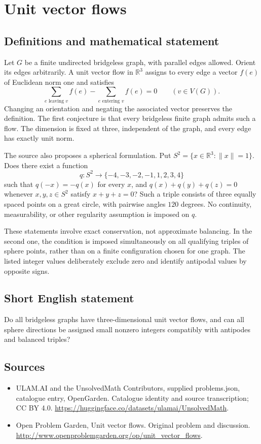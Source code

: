 \documentclass[11pt,a4paper]{article}
\begin{document}
\section*{Unit vector flows}\label{statement}

\subsection{Definitions and mathematical statement}
Let $G$ be a finite undirected bridgeless graph, with parallel edges allowed. Orient its edges arbitrarily. A unit vector flow in $\mathbb R^3$ assigns to every edge a vector $f(e)$ of Euclidean norm one and satisfies
\[
       \sum_{e\text{ leaving }v}f(e)
       -\sum_{e\text{ entering }v}f(e)=0
       \qquad(v\in V(G)).
\]
Changing an orientation and negating the associated vector preserves the definition. The first conjecture is that every bridgeless finite graph admits such a flow. The dimension is fixed at three, independent of the graph, and every edge has exactly unit norm.

The source also proposes a spherical formulation. Put $S^2=\{x\in\mathbb R^3:\|x\|=1\}$. Does there exist a function
\[
 q:S^2\longrightarrow\{-4,-3,-2,-1,1,2,3,4\}
\]
such that $q(-x)=-q(x)$ for every $x$, and $q(x)+q(y)+q(z)=0$ whenever $x,y,z\in S^2$ satisfy $x+y+z=0$? Such a triple consists of three equally spaced points on a great circle, with pairwise angles $120$ degrees. No continuity, measurability, or other regularity assumption is imposed on $q$.

These statements involve exact conservation, not approximate balancing. In the second one, the condition is imposed simultaneously on all qualifying triples of sphere points, rather than on a finite configuration chosen for one graph. The listed integer values deliberately exclude zero and identify antipodal values by opposite signs.
\subsection{Short English statement}
Do all bridgeless graphs have three-dimensional unit vector flows, and can all sphere directions be assigned small nonzero integers compatibly with antipodes and balanced triples?
\subsection{Sources}
\begin{itemize}
\item[S1] ULAM.AI and the UnsolvedMath Contributors, supplied problems.json, catalogue entry, OpenGarden. Catalogue identity and source transcription; CC BY 4.0.
\url{https://huggingface.co/datasets/ulamai/UnsolvedMath}.
\item[S2] Open Problem Garden, Unit vector flows. Original problem and discussion.
\url{http://www.openproblemgarden.org/op/unit_vector_flows}.
\end{itemize}
\end{document}
